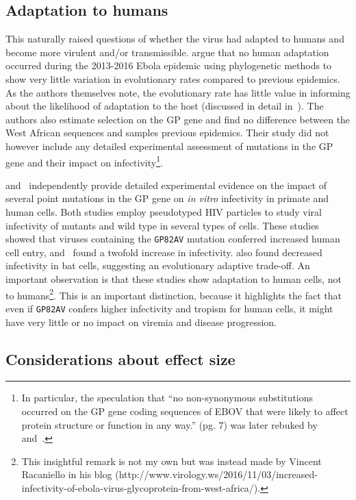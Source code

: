 \subsection{Adaptation to humans}

This naturally raised questions of whether the virus had adapted to humans and become more virulent and/or transmissible.
\cite{Li2016} argue that no human adaptation occurred during the 2013-2016 Ebola epidemic using phylogenetic methods to show very little variation in evolutionary rates compared to previous epidemics.
As the authors themselves note, the evolutionary rate has little value in informing about the likelihood of adaptation to the host (discussed in detail in~\cite{Holmes2016}).
The authors also estimate selection on the GP gene and find no difference between the West African sequences and samples previous epidemics.
Their study did not however include any detailed experimental assessment of mutations in the GP gene and their impact on infectivity\footnote{In particular, the speculation that ``no non-synonymous substitutions occurred
on the GP gene coding sequences of EBOV that were likely to affect protein structure or function in any way.'' (pg. 7) was later rebuked by~\cite{Urbanowicz2016} and~\cite{Diehl2016}.}.

\cite{Urbanowicz2016} and~\cite{Diehl2016} independently provide detailed experimental evidence on the impact of several point mutations in the GP gene on \textit{in vitro} infectivity in primate and human cells.
Both studies employ pseudotyped HIV particles to study viral infectivity of mutants and wild type in several types of cells.
These studies showed that viruses containing the \verb|GP82AV| mutation conferred increased human cell entry, and~\cite{Diehl2016} found a twofold increase in infectivity.
\cite{Urbanowicz2016} also found decreased infectivity in bat cells, suggesting an evolutionary adaptive trade-off.
An important observation is that these studies show adaptation to human cells, not to humans\footnote{This insightful remark is not my own but was instead made by Vincent Racaniello in his blog (http://www.virology.ws/2016/11/03/increased-infectivity-of-ebola-virus-glycoprotein-from-west-africa/).}.
This is an important distinction, because it highlights the fact that even if \verb|GP82AV| confers higher infectivity and tropism for human cells, it might have very little or no impact on viremia and disease progression. 

\subsection{Considerations about effect size}

